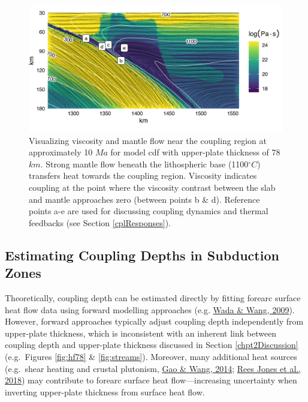\begin{figure}[htbp]

{\centering \includegraphics[width=1\linewidth,]{assets/figs/chpt2/fig6} 

}

\caption[Visualizing viscosity and mantle flow]{Visualizing viscosity and mantle flow near the coupling region at approximately 10 $Ma$ for model cdf with upper-plate thickness of 78 $km$. Strong mantle flow beneath the lithospheric base (1100$^{\circ}C$) transfers heat towards the coupling region. Viscosity indicates coupling at the point where the viscosity contrast between the slab and mantle approaches zero (between points b \& d). Reference points a-e are used for discussing coupling dynamics and thermal feedbacks (see Section \ref{cplResponses}).}\label{fig:flow}
\end{figure}

\hypertarget{estimating-coupling-depths-in-subduction-zones}{%
\subsection{Estimating Coupling Depths in Subduction Zones}\label{estimating-coupling-depths-in-subduction-zones}}

Theoretically, coupling depth can be estimated directly by fitting forearc surface heat flow data using forward modelling approaches (e.g. \protect\hyperlink{ref-wada2009}{Wada \& Wang, 2009}). However, forward approaches typically adjust coupling depth independently from upper-plate thickness, which is inconsistent with an inherent link between coupling depth and upper-plate thickness discussed in Section \ref{chpt2Discussion} (e.g.~Figures \ref{fig:hf78} \& \ref{fig:streams}). Moreover, many additional heat sources (e.g.~shear heating and crustal plutonism, \protect\hyperlink{ref-gao2014}{Gao \& Wang, 2014}; \protect\hyperlink{ref-reesjones2018}{Rees Jones et al., 2018}) may contribute to forearc surface heat flow---increasing uncertainty when inverting upper-plate thickness from surface heat flow.

